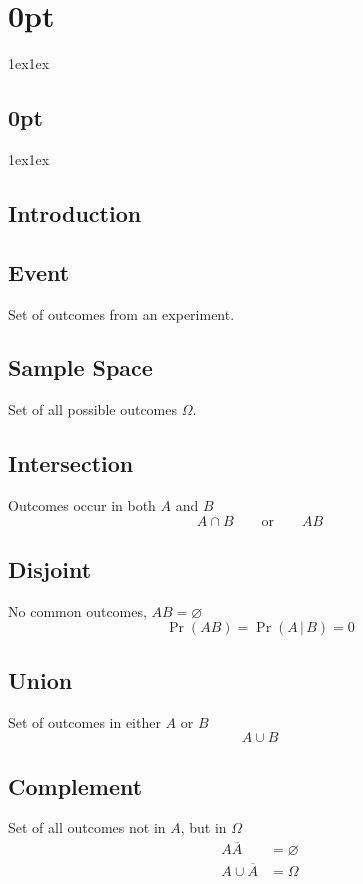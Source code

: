 \documentclass{article}
\begin{document}
\titlespacing*\section{0pt}{1ex}{1ex}
\titlespacing*\subsection{0pt}{1ex}{1ex}
%
\setlength\abovecaptionskip{8pt}
\setlength\belowcaptionskip{-15pt}
\setlength\textfloatsep{0pt}
%
\setlength\abovedisplayskip{1pt}
\setlength\belowdisplayskip{1pt}

\begin{multicols}{3}
    \section{Introduction}
    \subsection{Event}
    Set of outcomes from an experiment.
    \subsection{Sample Space}
    Set of all possible outcomes \(\Omega\).
    \subsection{Intersection}
    Outcomes occur in both \(A\) and \(B\)
    \begin{equation*}
        A \cap B \quad\quad \text{or} \quad\quad AB
    \end{equation*}
    \subsection{Disjoint}
    No common outcomes, \(AB = \varnothing\)
    \begin{equation*}
        \Pr{\left( AB \right)} = \Pr{\left( A \,\vert\, B \right)} = 0
    \end{equation*}
    \subsection{Union}
    Set of outcomes in either \(A\) or \(B\)
    \begin{equation*}
        A \cup B
    \end{equation*}
    \subsection{Complement}
    Set of all outcomes not in \(A\), but in \(\Omega \)
    \begin{align*}
        A\overline{A}       & = \varnothing \\
        A \cup \overline{A} & = \Omega
    \end{align*}

\end{multicols}
\end{document}
